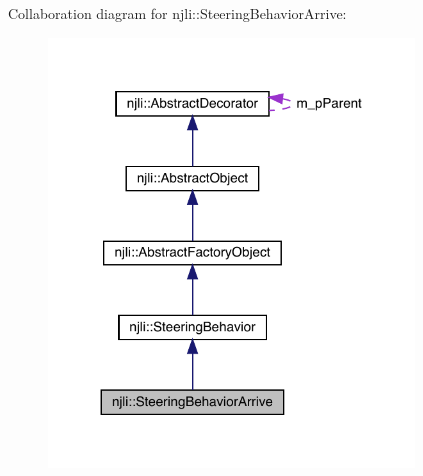 Collaboration diagram for njli\+:\+:Steering\+Behavior\+Arrive\+:\nopagebreak
\begin{figure}[H]
\begin{center}
\leavevmode
\includegraphics[width=275pt]{classnjli_1_1_steering_behavior_arrive__coll__graph}
\end{center}
\end{figure}
